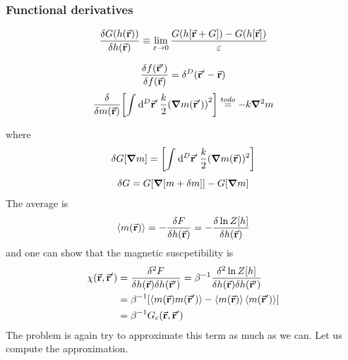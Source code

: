 \documentclass[../main/main.tex]{subfiles}
\begin{document}
\subsubsection{Functional derivatives}
\begin{equation}
  \frac{\delta G(h (\va{r}))}{\delta h (\va{r})} \equiv  \lim_{\varepsilon \rightarrow 0} \frac{G(h[\va{r}+G])- G(h[\va{r}])}{\varepsilon }
\end{equation}
\begin{example}
\begin{equation}
  \frac{\delta f (\va{r}')}{\delta f (\va{r})} = \delta ^D (\va{r}' - \va{r})
\end{equation}
\begin{equation}
  \frac{\delta }{\delta m (\va{r})} \qty[ \int_{}^{} \dd[D]{\va{r}'} \frac{k}{2} \qty(\grad m (\va{r}'))^2     ]  \overset{to do}{=} - k \grad ^2 m
\end{equation}
\end{example}
where
\begin{equation}
  \delta G [ \grad m] = \qty[ \int_{}^{} \dd[D]{\va{r}'} \frac{k}{2} ( \grad m(\va{r}))^2  ]
\end{equation}
\begin{equation}
  \delta G = G \qty[ \grad [m+\delta m]] - G [\grad m]
\end{equation}
The average is
\begin{equation}
  \expval{m(\va{r})} = - \frac{\delta F}{\delta h (\va{r})} = - \frac{\delta \ln{Z[h]} }{\delta h (\va{r})}
\end{equation}
and one can show that the magnetic suscpetibility is
\begin{equation}
\begin{split}
  \chi  (\va{r},\va{r}') & = \frac{\delta ^2 F}{\delta h(\va{r}) \delta h(\va{r}')}
  = \beta ^{-1} \frac{\delta ^2 \ln{Z[h]} }{\delta h (\va{r}) \delta h (\va{r}')}\\
  & = \beta ^{-1} \qty[ \expval{m(\va{r}) m (\va{r}')} - \expval{m (\va{r})} \expval{m(\va{r}')}  ] \\
  & = \beta ^{-1} G_c (\va{r},\va{r}') \\
\end{split}
\end{equation}
The problem is again try to approximate this term as much as we can.
Let us compute the approximation.
\end{document}
